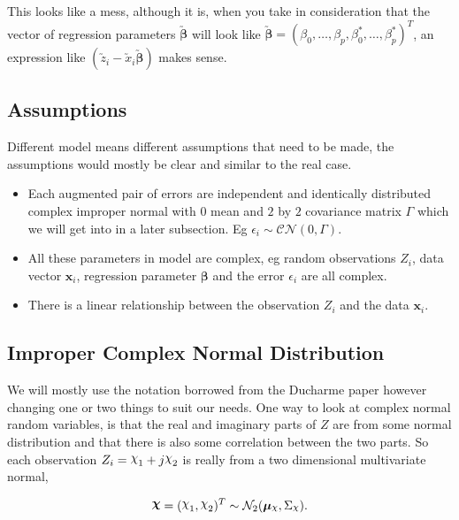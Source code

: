 \documentclass[honours,12pt]{unswthesis}
\newcommand{\augb}{\bm{\utilde{\beta}}}
\DeclareRobustCommand{\Chi}{{\mathpalette\irchi\relax}}
\newcommand{\irchi}[2]{\raisebox{\depth}{$#1\chi$}} %
\numberwithin{equation}{section}
\begin{document}
\noindent This looks like a mess, although it is, when you take in consideration that the vector of regression parameters $\augb$ will look like $\augb = \left( \beta_{0}, \hdots, \beta_{p}, \beta_{0}^{*}, \hdots, \beta_{p}^{*} \right)^{T}$, an expression like $\left( \utilde{z}_{i} - \utilde{x}_{i} \augb \right)$ makes sense.


\subsection{Assumptions}

Different model means different assumptions that need to be made, the assumptions would mostly be clear and similar to the real case.
\begin{itemize}
	\item Each augmented pair of errors are independent and identically distributed complex improper normal with $0$ mean and $2$ by $2$ covariance matrix $\Gamma$ which we will get into in a later subsection. Eg $\epsilon_{i} \sim \mathcal{CN} (0,\Gamma)$.
	\item All these parameters in model  are complex, eg random observations $Z_{i}$, data vector $\mathbf{x}_{i}$, regression parameter $\bm{\beta}$ and the error $\epsilon_{i}$ are all complex.
	\item There is a linear relationship between the observation $Z_{i}$ and the data $\mathbf{x}_{i}$.
\end{itemize}


\subsection{Improper Complex Normal Distribution}

We will mostly use the notation borrowed from the Ducharme paper \cite{ducharme2016} however changing one or two things to suit our needs. One way to look at complex normal random variables, is that the real and imaginary parts of $Z$ are from some normal distribution and that there is also some correlation between the two parts. So each observation $Z_{i} = \Chi_{1} + j \Chi_{2}$ is really from a two dimensional multivariate normal,

\begin{align*}
	\bm{\Chi} = (\Chi_{1}, \Chi_{2})^{T} \sim \mathcal{N}_{2} (\bm{\mu}_{\Chi}, \Sigma_{\Chi}).
\end{align*}
\end{document}
